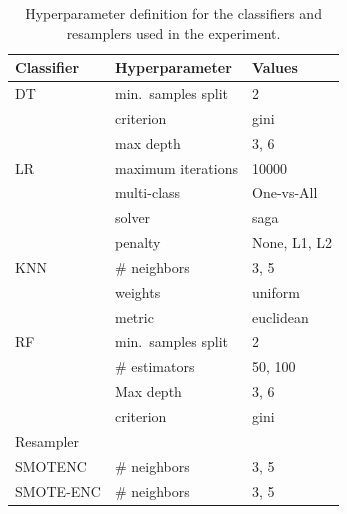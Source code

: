 \documentclass[preprint,12pt]{elsarticle}
\begin{document}
{\begin{table}[ht]
	\centering
    \caption{\label{tbl:grid}
        Hyperparameter definition for the classifiers and resamplers used in
        the experiment.
    }
	\begin{tabular}{lll}
		\toprule
		Classifier      & Hyperparameter                   & Values                         \\
		\midrule
        DT              & min.\ samples split              & 2                              \\
                        & criterion                        & gini                           \\
                        & max depth                        & 3, 6                           \\
		LR              & maximum iterations               & 10000                          \\
                        & multi-class                      & One-vs-All                     \\
		                & solver                           & saga                           \\
                        & penalty                          & None, L1, L2                   \\
		KNN             & \# neighbors                     & 3, 5                           \\
                        & weights                          & uniform                        \\
                        & metric                           & euclidean                      \\
		RF              & min.\ samples split              & 2                              \\
		                & \# estimators                    & 50, 100                        \\
		                & Max depth                        & 3, 6                           \\
                        & criterion                        & gini                           \\
		\toprule
		Resampler       &                                  &                                \\
		\midrule
		SMOTENC         & \# neighbors                     & 3, 5                           \\
		SMOTE-ENC       & \# neighbors                     & 3, 5                           \\

\end{tabular}
\end{table}}
\end{document}
